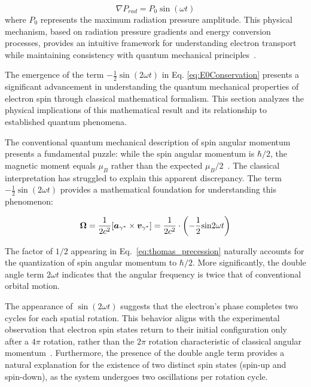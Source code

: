 \documentclass[%
 reprint,
 amsmath,amssymb,
 aps,
]{revtex4-1}
\numberwithin{equation}{section}%
\begin{document}
\begin{equation}
\nabla P_{rad} = P_0 \sin(\omega t)
\label{eq:gradient}
\end{equation}
where $P_0$ represents the maximum radiation pressure amplitude. This physical mechanism, based on radiation pressure gradients and energy conversion processes, provides an intuitive framework for understanding electron transport while maintaining consistency with quantum mechanical principles~\cite{Hanamura2023}.


The emergence of the term $-\frac{1}{2}\sin(2\omega t)$ in Eq. \eqref{eq:E0Conservation} presents a significant advancement in understanding the quantum mechanical properties of electron spin through classical mathematical formalism. This section analyzes the physical implications of this mathematical result and its relationship to established quantum phenomena.

The conventional quantum mechanical description of spin angular momentum presents a fundamental puzzle: while the spin angular momentum is $\hbar / 2$, the magnetic moment equals $\mu_B$ rather than the expected $\mu_B / 2$~\cite{pauli1946}. The classical interpretation has struggled to explain this apparent discrepancy. The term $-\frac{1}{2}\sin(2\omega t)$ provides a mathematical foundation for understanding this phenomenon:

\begin{equation}
\label{eq:thomas_precession}
{\bf \Omega} = \frac{1}{2c^2}[\boldsymbol a_{\gamma^{*}} \times \boldsymbol v_{\gamma^{*}}] = \frac{1}{2 c^2} \cdot \left( - \frac{1}{2} \mathrm{sin}2\omega t \right)
\end{equation}

The factor of $1/2$ appearing in Eq.~\ref{eq:thomas_precession} naturally accounts for the quantization of spin angular momentum to $\hbar/2$. More significantly, the double angle term $2\omega t$ indicates that the angular frequency is twice that of conventional orbital motion.

The appearance of $\sin(2\omega t)$ suggests that the electron's phase completes two cycles for each spatial rotation. This behavior aligns with the experimental observation that electron spin states return to their initial configuration only after a $4\pi$ rotation, rather than the $2\pi$ rotation characteristic of classical angular momentum~\cite{Thomas1926}. Furthermore, the presence of the double angle term provides a natural explanation for the existence of two distinct spin states (spin-up and spin-down), as the system undergoes two oscillations per rotation cycle.
\end{document}
